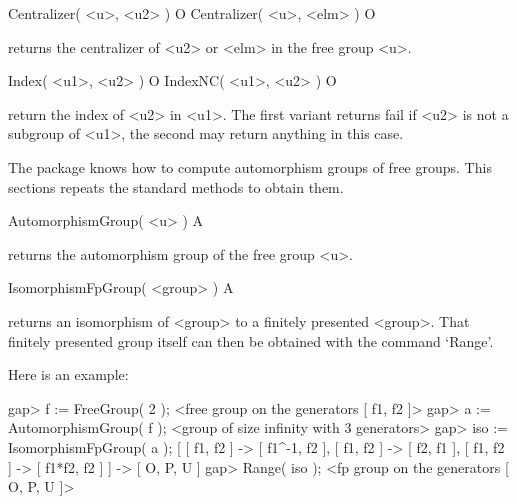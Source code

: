 \>Centralizer( <u>, <u2> ) O
\>Centralizer( <u>, <elm> ) O

returns the centralizer of <u2> or <elm> in the free group <u>.

\>Index( <u1>, <u2> ) O
\>IndexNC( <u1>, <u2> ) O

return the index of <u2> in <u1>.  The first variant returns
fail if <u2> is not a subgroup of <u1>, the second may return
anything in this case.


The {\FGA} package knows how to compute automorphism groups of free
groups. This sections repeats the {\GAP} standard methods to obtain them.

\>AutomorphismGroup( <u> ) A

returns the automorphism group of the free group <u>.

\>IsomorphismFpGroup( <group> ) A

returns an isomorphism of <group> to a finitely presented <group>.  That
finitely presented group itself can then be obtained with the command
`Range'.

Here is an example:

\beginexample
gap> f := FreeGroup( 2 );
<free group on the generators [ f1, f2 ]>
gap> a := AutomorphismGroup( f );
<group of size infinity with 3 generators>
gap> iso := IsomorphismFpGroup( a );
[ [ f1, f2 ] -> [ f1^-1, f2 ], [ f1, f2 ] -> [ f2, f1 ], 
  [ f1, f2 ] -> [ f1*f2, f2 ] ] -> [ O, P, U ]
gap> Range( iso );
<fp group on the generators [ O, P, U ]>
\endexample



